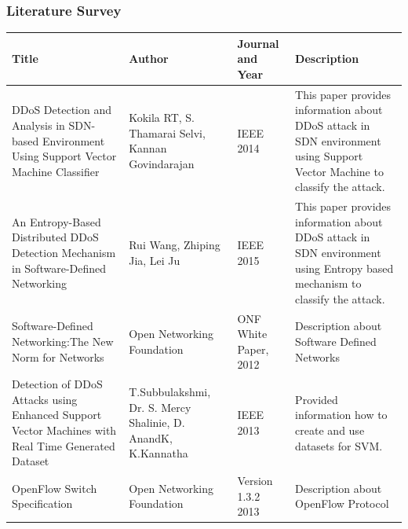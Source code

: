 \documentclass[10pt]{beamer}
\begin{document}





\begin{frame}
\frametitle{Literature Survey}
\scriptsize
\begin{center}
\begin{tabular}{ | m{2cm} | m{2cm}| m{2cm} | m{3cm} | } 
\hline
\textbf{Title} & \textbf{Author} & \textbf{Journal and Year} & \textbf{Description} \\
\hline
DDoS Detection and Analysis in SDN-based Environment Using Support Vector Machine Classifier & 
Kokila RT, S. Thamarai Selvi, Kannan Govindarajan & 
IEEE 2014 & 
This paper provides information about DDoS attack in SDN environment using Support Vector Machine to classify the attack.\\ 
\hline
An Entropy-Based Distributed DDoS Detection Mechanism in Software-Defined Networking &
Rui Wang, Zhiping Jia, Lei Ju & 
IEEE 2015 & 
This paper provides information about DDoS attack in SDN environment using Entropy based mechanism to classify the attack.\\ 
\hline
Software-Defined Networking:The New Norm for Networks & 
Open Networking Foundation & 
ONF White Paper, 2012 & 
Description about Software Defined Networks\\
\hline
Detection of DDoS Attacks using Enhanced Support Vector Machines with Real Time Generated Dataset & 
T.Subbulakshmi, Dr. S. Mercy Shalinie, D. AnandK,  K.Kannatha&
IEEE 2013 &
Provided information how to create and use datasets for SVM.\\
\hline
OpenFlow Switch Specification& 
Open Networking Foundation &
Version 1.3.2 2013 &
Description about OpenFlow Protocol\\
\hline
\end{tabular}
\end{center}
\end{frame}
\end{document}

